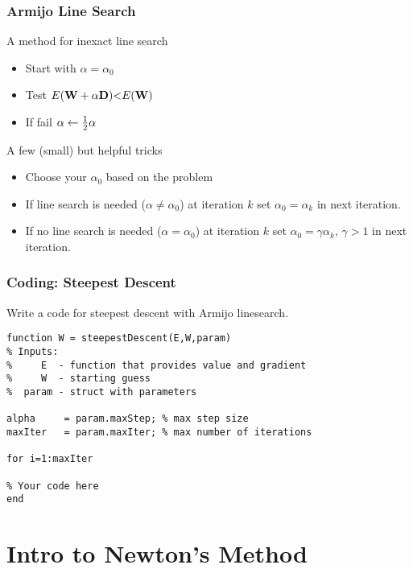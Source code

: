 \documentclass[12pt,fleqn,handout]{beamer}
\begin{document}
\begin{frame}\frametitle{Armijo Line Search}

A method for inexact line search


\begin{itemize}
\item Start with $\alpha = \alpha_0$
\item Test $ E({\bf W} + \alpha {\bf D}) {<} E({\bf W})$
\item If fail $\alpha \leftarrow {\frac 12} \alpha$
\end{itemize}

\bigskip
\pause

A few (small) but helpful tricks
\begin{itemize}
\item Choose your $\alpha_0$ based on the problem
\item If line search is needed ($\alpha\not=\alpha_0$) at iteration $k$ set $\alpha_0 = \alpha_k$ in next iteration.
\item If no line search is needed ($\alpha =\alpha_0$) at iteration $k$ set $\alpha_0 = \gamma\alpha_k$, $\gamma>1$ in next iteration.
\end{itemize}


\end{frame}


\begin{frame}[fragile]\frametitle{Coding: Steepest Descent }

Write a code for steepest descent with Armijo linesearch.

\begin{verbatim}
function W = steepestDescent(E,W,param)
% Inputs:
%     E  - function that provides value and gradient
%     W  - starting guess
%  param - struct with parameters

alpha     = param.maxStep; % max step size
maxIter   = param.maxIter; % max number of iterations

for i=1:maxIter

% Your code here
end
\end{verbatim}

\end{frame}


\section{Intro to Newton's Method} %
\label{sec:logistic_regression_and_softmax}
\end{document}
